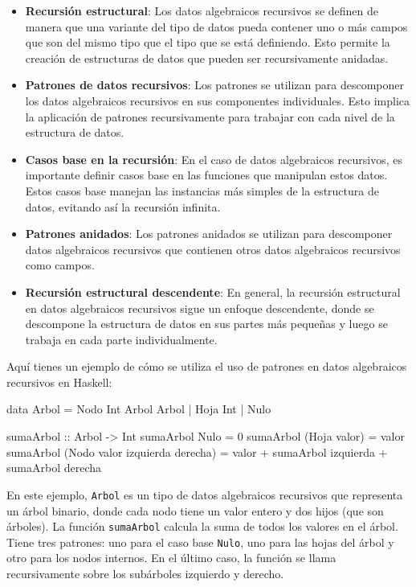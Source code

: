 \documentclass{article}
\begin{document}
\begin{itemize}
    \item \textbf{Recursión estructural}: Los datos algebraicos recursivos se definen de manera que una variante del tipo de datos pueda contener uno o más campos que son del mismo tipo que el tipo que se está definiendo. Esto permite la creación de estructuras de datos que pueden ser recursivamente anidadas.
    
    \item \textbf{Patrones de datos recursivos}: Los patrones se utilizan para descomponer los datos algebraicos recursivos en sus componentes individuales. Esto implica la aplicación de patrones recursivamente para trabajar con cada nivel de la estructura de datos.
    
    \item \textbf{Casos base en la recursión}: En el caso de datos algebraicos recursivos, es importante definir casos base en las funciones que manipulan estos datos. Estos casos base manejan las instancias más simples de la estructura de datos, evitando así la recursión infinita.
    
    \item \textbf{Patrones anidados}: Los patrones anidados se utilizan para descomponer datos algebraicos recursivos que contienen otros datos algebraicos recursivos como campos.
    
    \item \textbf{Recursión estructural descendente}: En general, la recursión estructural en datos algebraicos recursivos sigue un enfoque descendente, donde se descompone la estructura de datos en sus partes más pequeñas y luego se trabaja en cada parte individualmente.
\end{itemize}

Aquí tienes un ejemplo de cómo se utiliza el uso de patrones en datos algebraicos recursivos en Haskell:

\begin{haskell}
data Arbol = Nodo Int Arbol Arbol | Hoja Int | Nulo

sumaArbol :: Arbol -> Int
sumaArbol Nulo = 0
sumaArbol (Hoja valor) = valor
sumaArbol (Nodo valor izquierda derecha) = 
    valor + sumaArbol izquierda + sumaArbol derecha
\end{haskell}

En este ejemplo, \texttt{Arbol} es un tipo de datos algebraicos recursivos que representa un árbol binario, donde cada nodo tiene un valor entero y dos hijos (que son árboles). La función \texttt{sumaArbol} calcula la suma de todos los valores en el árbol. Tiene tres patrones: uno para el caso base \texttt{Nulo}, uno para las hojas del árbol y otro para los nodos internos. En el último caso, la función se llama recursivamente sobre los subárboles izquierdo y derecho.
\end{document}
